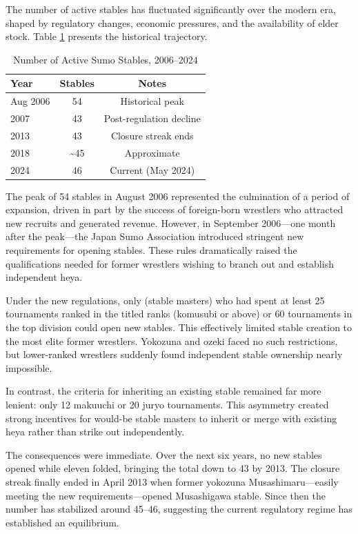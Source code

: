 The number of active stables has fluctuated significantly over the modern era, shaped by regulatory changes, economic pressures, and the availability of elder stock. Table \ref{tab:stable_count} presents the historical trajectory.

\begin{table}[h]
\centering
\small
\caption{Number of Active Sumo Stables, 2006--2024}
\label{tab:stable_count}
\begin{tabular}{lcc}
\toprule
\textbf{Year} & \textbf{Stables} & \textbf{Notes} \\
\midrule
Aug 2006 & 54 & Historical peak \\
2007 & 43 & Post-regulation decline \\
2013 & 43 & Closure streak ends \\
2018 & \textasciitilde45 & Approximate \\
2024 & 46 & Current (May 2024) \\
\bottomrule
\end{tabular}
\end{table}

The peak of 54 stables in August 2006 represented the culmination of a period of expansion, driven in part by the success of foreign-born wrestlers who attracted new recruits and generated revenue. However, in September 2006—one month after the peak—the Japan Sumo Association introduced stringent new requirements for opening stables. These rules dramatically raised the qualifications needed for former wrestlers wishing to branch out and establish independent heya.

Under the new regulations, only  (stable masters) who had spent at least 25 tournaments ranked in the titled  ranks (komusubi or above) or 60 tournaments in the top  division could open new stables. This effectively limited stable creation to the most elite former wrestlers. Yokozuna and ozeki faced no such restrictions, but lower-ranked wrestlers suddenly found independent stable ownership nearly impossible.

In contrast, the criteria for inheriting an existing stable remained far more lenient: only 12 makuuchi or 20 juryo tournaments. This asymmetry created strong incentives for would-be stable masters to inherit or merge with existing heya rather than strike out independently.

The consequences were immediate. Over the next six years, no new stables opened while eleven folded, bringing the total down to 43 by 2013. The closure streak finally ended in April 2013 when former yokozuna Musashimaru—easily meeting the new requirements—opened Musashigawa stable. Since then the number has stabilized around 45--46, suggesting the current regulatory regime has established an equilibrium.

